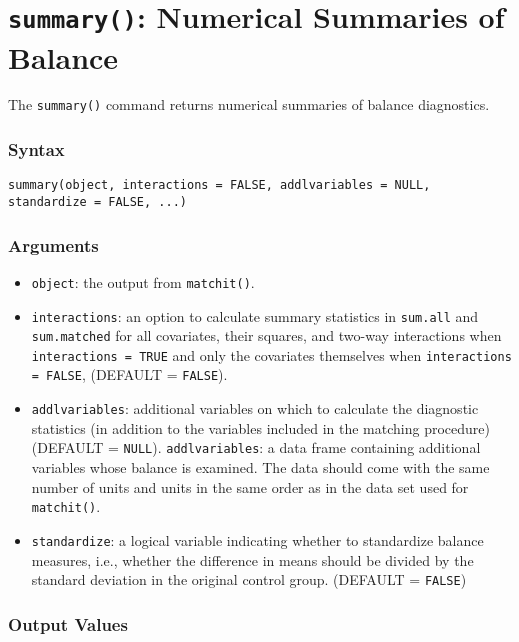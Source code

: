 \section{\texttt{summary()}: Numerical Summaries of Balance}

The \texttt{summary()} command returns numerical summaries of balance
diagnostics.

\subsubsection{Syntax}
\begin{verbatim}
summary(object, interactions = FALSE, addlvariables = NULL, standardize = FALSE, ...)
\end{verbatim}

\subsubsection{Arguments}

\begin{itemize}
\item \texttt{object}: the output from {\tt matchit()}.
\item \texttt{interactions}: an option to calculate summary statistics
  in \texttt{sum.all} and \texttt{sum.matched} for all covariates,
  their squares, and two-way interactions when \texttt{interactions =
    TRUE} and only the covariates themselves when \texttt{interactions
    = FALSE}, (DEFAULT = {\tt FALSE}).
\item \texttt{addlvariables}: additional variables on which to
  calculate the diagnostic statistics (in addition to the variables
  included in the matching procedure) (DEFAULT = {\tt NULL}).
  \texttt{addlvariables}: a data frame containing additional variables
  whose balance is examined. The data should come with the same number
  of units and units in the same order as in the data set used for
  {\tt matchit()}.
\item \texttt{standardize}: a logical variable indicating whether to
  standardize balance measures, i.e., whether the difference in means should be divided
  by the standard deviation in the original control group. (DEFAULT = {\tt FALSE})
\end{itemize}

\subsubsection{Output Values}

